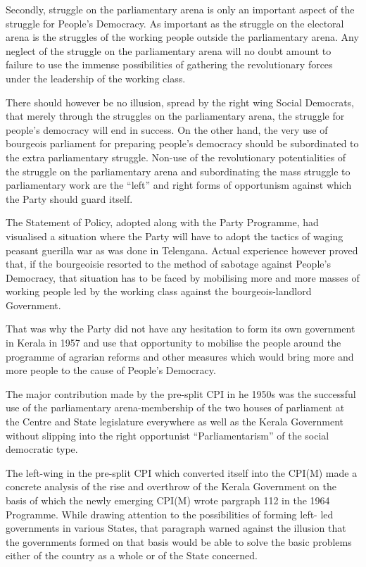 Secondly, struggle on the parliamentary arena is only an important aspect of the struggle for People's Democracy. As important as the struggle on the electoral arena is the struggles of the working people outside the parliamentary arena. Any neglect of the struggle on the parliamentary arena will no doubt amount to failure to use the immense possibilities of gathering the revolutionary forces under the leadership of the working class.


There should however be no illusion, spread by the right wing Social Democrats, that merely through the struggles on the parliamentary arena, the struggle for people’s democracy will end in success. On the other hand, the very use of bourgeois parliament for preparing people’s democracy should be subordinated to the extra parliamentary struggle. Non-use of the revolutionary potentialities of the struggle on the parliamentary arena and subordinating the mass struggle to parliamentary work are the “left” and right forms of opportunism against which the Party should guard itself. 

The Statement of Policy, adopted along with the Party Programme, had visualised a situation where the Party will have to adopt the tactics of waging peasant guerilla war as was done in Telengana. Actual experience however proved that, if the bourgeoisie resorted to the method of sabotage against People’s Democracy, that situation has to be faced by mobilising more and more masses of working people led by the working class against the bourgeois-landlord Government. 

That was why the Party did not have any hesitation to form its own government in Kerala in 1957 and use that opportunity to mobilise the people around the programme of agrarian reforms and other measures which would bring more and more people to the cause of People’s Democracy. 

The major contribution made by the pre-split CPI in he 1950s was the successful use of the parliamentary arena-membership of the two houses of parliament at the Centre and State legislature everywhere as well as the Kerala Government without slipping into the right opportunist “Parliamentarism” of the social democratic type. 

The left-wing in the pre-split CPI which converted itself into the CPI(M) made a concrete analysis of the rise and overthrow of the Kerala Government on the basis of which the newly emerging CPI(M) wrote pargraph 112 in the 1964 Programme. While drawing attention to the possibilities of forming left- led governments in various States, that paragraph warned against the illusion that the governments formed on that basis would be able to solve the basic problems either of the country as a whole or of the State concerned. 

